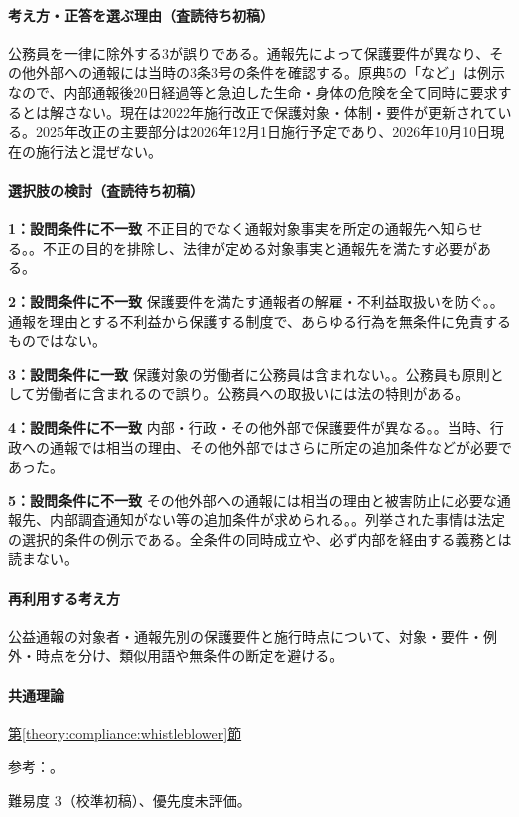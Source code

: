 \paragraph{考え方・正答を選ぶ理由（査読待ち初稿）} 公務員を一律に除外する3が誤りである。通報先によって保護要件が異なり、その他外部への通報には当時の3条3号の条件を確認する。原典5の「など」は例示なので、内部通報後20日経過等と急迫した生命・身体の危険を全て同時に要求するとは解さない。現在は2022年施行改正で保護対象・体制・要件が更新されている。2025年改正の主要部分は2026年12月1日施行予定であり、2026年10月10日現在の施行法と混ぜない。

\paragraph{選択肢の検討（査読待ち初稿）}\mbox{}\par

\noindent\textbf{1：設問条件に不一致} 不正目的でなく通報対象事実を所定の通報先へ知らせる。。不正の目的を排除し、法律が定める対象事実と通報先を満たす必要がある。\par

\noindent\textbf{2：設問条件に不一致} 保護要件を満たす通報者の解雇・不利益取扱いを防ぐ。。通報を理由とする不利益から保護する制度で、あらゆる行為を無条件に免責するものではない。\par

\noindent\textbf{3：設問条件に一致} 保護対象の労働者に公務員は含まれない。。公務員も原則として労働者に含まれるので誤り。公務員への取扱いには法の特則がある。\par

\noindent\textbf{4：設問条件に不一致} 内部・行政・その他外部で保護要件が異なる。。当時、行政への通報では相当の理由、その他外部ではさらに所定の追加条件などが必要であった。\par

\noindent\textbf{5：設問条件に不一致} その他外部への通報には相当の理由と被害防止に必要な通報先、内部調査通知がない等の追加条件が求められる。。列挙された事情は法定の選択的条件の例示である。全条件の同時成立や、必ず内部を経由する義務とは読まない。\par

\paragraph{再利用する考え方} 公益通報の対象者・通報先別の保護要件と施行時点について、対象・要件・例外・時点を分け、類似用語や無条件の断定を避ける。

\paragraph{共通理論} \hyperref[theory:compliance:whistleblower]{第\ref*{theory:compliance:whistleblower}節}

\par 参考：\cite{caa_handbook_pre2022,caa_report_current,caa_amend2020,caa_schedule2026}。

\par 難易度 3（校準初稿）、優先度未評価。

